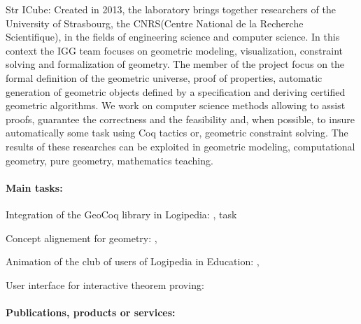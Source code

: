 \begin{sitedescription}{Str}
ICube: Created in 2013, the laboratory brings together researchers of the University of Strasbourg, the CNRS(Centre National de la Recherche Scientifique), in the fields of engineering science and computer science.
In this context the IGG team focuses on geometric modeling, visualization, constraint solving and formalization of geometry. The member of the project focus on the formal definition of the geometric universe, proof of properties, automatic generation of geometric objects defined by a specification and deriving certified geometric algorithms. We work on computer science methods allowing to assist proofs, guarantee the correctness and the feasibility and, when possible, to insure automatically some task using Coq tactics or, geometric constraint solving. The results of these researches can be exploited in geometric modeling, computational geometry, pure geometry, mathematics teaching.

\paragraph{Main tasks:}



\begin{compactitem}
\item Integration of the GeoCoq library in Logipedia: , task 
\item Concept alignement for geometry: , 
\item Animation of the club of users of Logipedia in Education: ,  
\item User interface for interactive theorem proving:  
\end{compactitem}

\paragraph{Publications, products or services:}



\end{sitedescription}
